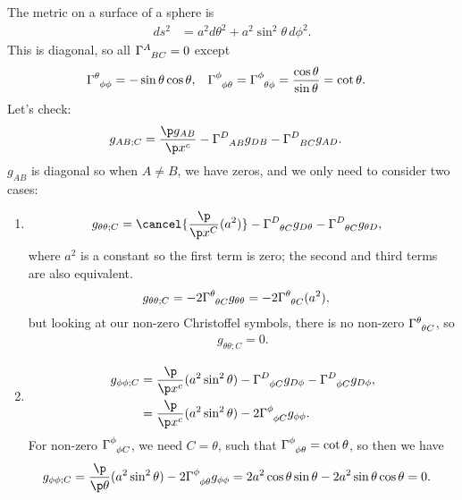 \documentclass[a4paper, 11pt, normalem]{report}
\begin{document}
\begin{example}
The metric on a surface of a sphere is
\begin{align}
    ds^2 &= a^2d\theta^2 + a^2\sin^2\theta\,d\phi^2.
\end{align}
This is diagonal, so all $\tensor{\Gamma}{^A_{BC}} = 0$ except
\begin{align}
    \tensor{\Gamma}{^\theta_{\phi\phi}} &= -\sin\theta\cos\theta, & \tensor{\Gamma}{^\phi_{\phi\theta}} &= \tensor{\Gamma}{^\phi_{\theta\phi}} = \frac{\cos\theta}{\sin\theta} = \cot\theta.
\end{align}
Let's check:
\begin{align}
    g_{AB;C} &= \frac{\p g_{AB}}{\p x^c} - \tensor{\Gamma}{^D_{AB}}g_{DB} - \tensor{\Gamma}{^D_{BC}}g_{AD}.
\end{align}
$g_{AB}$ is diagonal so when $A\neq B$, we have zeros, and we only need to consider two cases:
\begin{enumerate}
    \item   
        \begin{align}
            g_{\theta\theta;C} &= \cancel{\frac{\p}{\p x^C}(a^2)} - \tensor{\Gamma}{^D_{\theta C}}g_{D\theta} - \tensor{\Gamma}{^D_{\theta C}}g_{\theta D},
        \end{align}
        where $a^2$ is a constant so the first term is zero; the second and third terms are also equivalent.
        \begin{align}
            g_{\theta\theta;C} &= -2\tensor{\Gamma}{^\theta_{\theta C}}g_{\theta\theta} = -2\tensor{\Gamma}{^\theta_{\theta C}}(a^2),
        \end{align}
        but looking at our non-zero Christoffel symbols, there is no non-zero $\tensor{\Gamma}{^\theta_{\theta C}}$, so
        \begin{align}
            g_{\theta\theta;C} = 0.
        \end{align}
    \item
        \begin{align}
            \begin{split}
                g_{\phi\phi;C} &= \frac{\p}{\p x^c}(a^2\sin^2\theta) - \tensor{\Gamma}{^D_{\phi C}}g_{D\phi} - \tensor{\Gamma}{^D_{\phi C}}g_{D\phi}, \\
                               &= \frac{\p}{\p x^c}(a^2\sin^2\theta) - 2\tensor{\Gamma}{^\phi_{\phi C}}g_{\phi\phi}.
            \end{split}
        \end{align}
        For non-zero $\tensor{\Gamma}{^\phi_{\phi C}}$, we need $C=\theta$, such that $\tensor{\Gamma}{^\phi_{\phi\theta}} = \cot\theta$, so then we have
        \begin{align}
            g_{\phi\phi;C} &= \frac{\p}{\p\theta}(a^2\sin^2\theta) - 2\tensor{\Gamma}{^\phi_{\phi\theta}}g_{\phi\phi} = 2a^2\cos\theta\sin\theta - 2a^2\sin\theta\cos\theta = 0.
        \end{align}
\end{enumerate}
\end{example}
\end{document}
